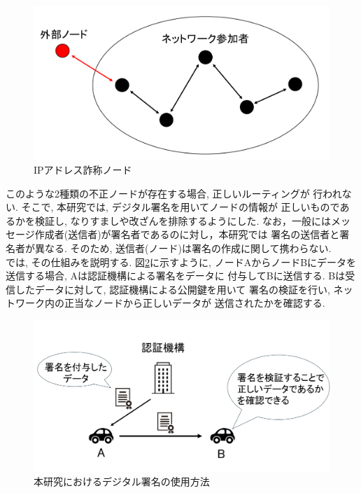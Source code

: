 \begin{figure}
  \centering
  \includegraphics[scale=0.6]{figures/ip-liar.png}
  \caption{IPアドレス詐称ノード\cite{shinato}}
  \label{fig:ip-liar}
\end{figure}

\indent このような2種類の不正ノードが存在する場合, 正しいルーティングが
行われない. そこで, 本研究では, デジタル署名を用いてノードの情報が
正しいものであるかを検証し, なりすましや改ざんを排除するようにした. 
なお，一般にはメッセージ作成者(送信者)が署名者であるのに対し，本研究では
署名の送信者と署名者が異なる. そのため, 送信者(ノード)は署名の作成に関して携わらない.  \\
\indent では, その仕組みを説明する. 図\ref{fig:signature-method}に示すように, 
ノードAからノードBにデータを送信する場合, Aは認証機構による署名をデータに
付与してBに送信する. Bは受信したデータに対して, 認証機構による公開鍵を用いて
署名の検証を行い, ネットワーク内の正当なノードから正しいデータが
送信されたかを確認する. 
\newpage

\begin{figure}
  \centering
  \includegraphics[scale=0.6]{figures/signature-method.png}
  \caption{本研究におけるデジタル署名の使用方法\cite{shinato}}
  \label{fig:signature-method}
\end{figure}


